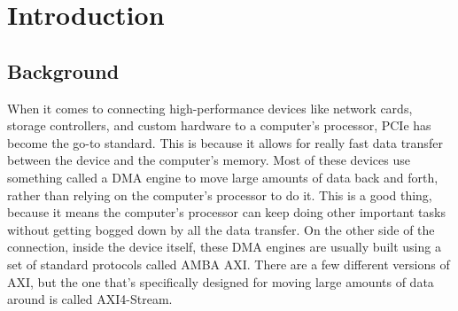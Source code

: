 
\chapter{Introduction}

\label{Chapter1}



\section{Background}
\label{sec:ch1_background}

When it comes to connecting high-performance devices like network cards, storage controllers, and custom hardware to a computer's processor, PCIe has become the go-to standard. This is because it allows for really fast data transfer between the device and the computer's memory. Most of these devices use something called a DMA engine to move large amounts of data back and forth, rather than relying on the computer's processor to do it. This is a good thing, because it means the computer's processor can keep doing other important tasks without getting bogged down by all the data transfer. On the other side of the connection, inside the device itself, these DMA engines are usually built using a set of standard protocols called AMBA AXI. There are a few different versions of AXI, but the one that's specifically designed for moving large amounts of data around is called AXI4-Stream. 

